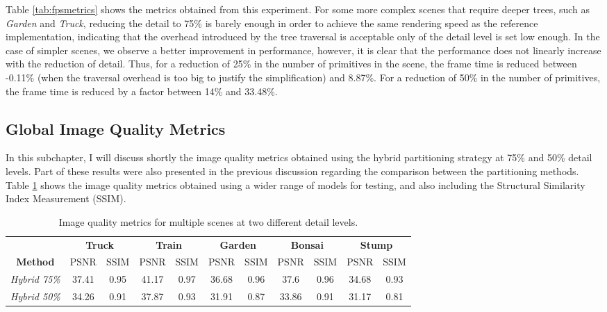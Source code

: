 Table \ref{tab:fpsmetrics} shows the metrics obtained from this experiment. For some more complex scenes that require deeper trees, such as \textit{Garden} and \textit{Truck}, reducing the detail to 75\% is barely enough in order to achieve the same rendering speed as the reference implementation, indicating that the overhead introduced by the tree traversal is acceptable only of the detail level is set low enough. In the case of simpler scenes, we observe a better improvement in performance, however, it is clear that the performance does not linearly increase with the reduction of detail. Thus, for a reduction of 25\% in the number of primitives in the scene, the frame time is reduced between -0.11\% (when the traversal overhead is too big to justify the simplification) and 8.87\%. For a reduction of 50\% in the number of primitives, the frame time is reduced by a factor between 14\% and 33.48\%.

\subsection{Global Image Quality Metrics}
In this subchapter, I will discuss shortly the image quality metrics obtained using the hybrid partitioning strategy at 75\% and 50\% detail levels. Part of these results were also presented in the previous discussion regarding the comparison between the partitioning methods. Table \ref{tab:quality} shows the image quality metrics obtained using a wider range of models for testing, and also including the Structural Similarity Index Measurement (SSIM).

\begin{table}[H]
\begin{tabular}{ccccccccccc}
                                          & \multicolumn{2}{c}{\textbf{Truck}} & \multicolumn{2}{c}{\textbf{Train}} & \multicolumn{2}{c}{\textbf{Garden}} & \multicolumn{2}{c}{\textbf{Bonsai}} & \multicolumn{2}{c}{\textbf{Stump}} \\
\multicolumn{1}{c|}{\textbf{Method}}      & PSNR   & \multicolumn{1}{c|}{SSIM} & PSNR   & \multicolumn{1}{c|}{SSIM} & PSNR   & \multicolumn{1}{c|}{SSIM}  & PSNR   & \multicolumn{1}{c|}{SSIM}  & PSNR             & SSIM            \\ \hline
\multicolumn{1}{c|}{\textit{Hybrid 75\%}} & 37.41  & \multicolumn{1}{c|}{0.95} & 41.17  & \multicolumn{1}{c|}{0.97} & 36.68  & \multicolumn{1}{c|}{0.96}  & 37.6   & \multicolumn{1}{c|}{0.96}  & 34.68            & 0.93            \\ \hline
\multicolumn{1}{c|}{\textit{Hybrid 50\%}} & 34.26  & \multicolumn{1}{c|}{0.91} & 37.87  & \multicolumn{1}{c|}{0.93} & 31.91  & \multicolumn{1}{c|}{0.87}  & 33.86  & \multicolumn{1}{c|}{0.91}  & 31.17            & 0.81           
\end{tabular}
\caption{Image quality metrics for multiple scenes at two different detail levels.}
\label{tab:quality}
\end{table}

